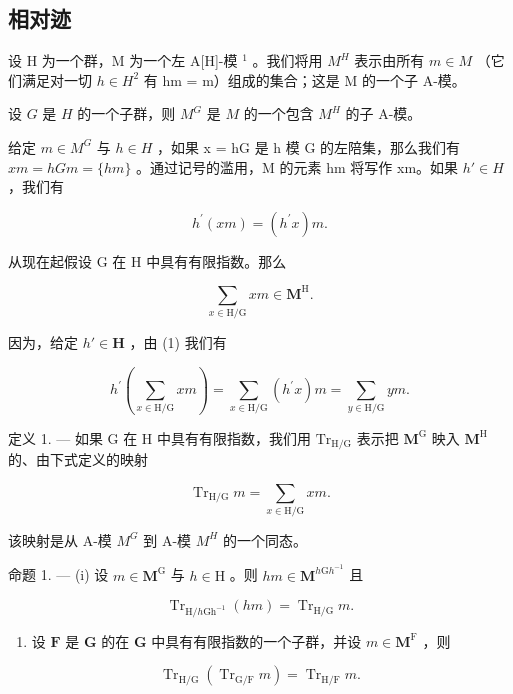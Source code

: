 \subsection{相对迹}

设 H 为一个群，M 为一个左 A{[}H{]}-模 \(^{1}\) 。我们将用 \(M^{H}\) 表示由所有 \(m \in M\) （它们满足对一切 \(h \in H^{2}\) 有 hm = m）组成的集合；这是 M 的一个子 A-模。

设 \(G\) 是 \(H\) 的一个子群，则 \(M^G\) 是 \(M\) 的一个包含 \(M^H\) 的子 A-模。

给定 \(m \in M^{G}\) 与 \(h \in H\) ，如果 x = hG 是 h 模 G 的左陪集，那么我们有 \(xm = hGm = \{hm\}\) 。通过记号的滥用，M 的元素 hm 将写作 xm。如果 \(h' \in H\) ，我们有

\[
h ^ {\prime} (x m) = \left(h ^ {\prime} x\right) m.\tag{1}
\]

从现在起假设 G 在 H 中具有有限指数。那么

\[
\sum_ {x \in \mathrm{H} / \mathrm{G}} x m \in \mathbf {M} ^ {\mathrm{H}}.\tag{2}
\]

因为，给定 \(h' \in \mathbf{H}\) ，由 (1) 我们有

\[
h ^ {\prime} \left(\sum_ {x \in \mathrm{H} / \mathrm{G}} x m\right) = \sum_ {x \in \mathrm{H} / \mathrm{G}} \left(h ^ {\prime} x\right) m = \sum_ {y \in \mathrm{H} / \mathrm{G}} y m.
\]

定义 1. --- 如果 G 在 H 中具有有限指数，我们用 \(\mathrm{Tr}_{\mathrm{H}/\mathrm{G}}\) 表示把 \(\mathbf{M}^{\mathrm{G}}\) 映入 \(\mathbf{M}^{\mathrm{H}}\) 的、由下式定义的映射

\[
\operatorname{Tr} _ {\mathrm{H} / \mathrm{G}} m = \sum_ {x \in \mathrm{H} / \mathrm{G}} x m.\tag{3}
\]

该映射是从 A-模 \(M^{G}\) 到 A-模 \(M^{H}\) 的一个同态。

命题 1. --- (i) 设 \(m \in \mathbf{M}^{\mathrm{G}}\) 与 \(h \in \mathrm{H}\) 。则 \(hm \in \mathbf{M}^{h\mathrm{G}h^{-1}}\) 且

\[
\operatorname{Tr} _ {\mathrm{H} / h \mathrm{Gh} ^ {- 1}} (h m) = \operatorname{Tr} _ {\mathrm{H} / \mathrm{G}} m.
\]

\begin{enumerate}
\def\labelenumi{(\roman{enumi})}
\setcounter{enumi}{1}
\tightlist
\item
  设 \(\mathbf{F}\) 是 \(\mathbf{G}\) 的在 \(\mathbf{G}\) 中具有有限指数的一个子群，并设 \(m \in \mathbf{M}^{\mathrm{F}}\) ，则
\end{enumerate}

\[
\operatorname{Tr} _ {\mathrm{H} / \mathrm{G}} \left(\operatorname{Tr} _ {\mathrm{G} / \mathrm{F}} m\right) = \operatorname{Tr} _ {\mathrm{H} / \mathrm{F}} m.
\]

